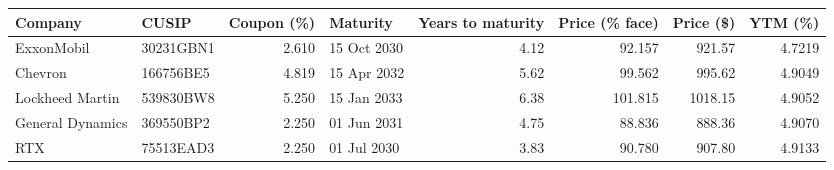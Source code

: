 
\begin{tabular}{llrlrrrr}
\toprule
Company & CUSIP & Coupon (\%) & Maturity & Years to maturity & Price (\% face) & Price (\$) & YTM (\%)\\
\midrule
ExxonMobil & 30231GBN1 & 2.610 & 15 Oct 2030 & 4.12 & 92.157 & 921.57 & 4.7219\\
Chevron & 166756BE5 & 4.819 & 15 Apr 2032 & 5.62 & 99.562 & 995.62 & 4.9049\\
Lockheed Martin & 539830BW8 & 5.250 & 15 Jan 2033 & 6.38 & 101.815 & 1018.15 & 4.9052\\
General Dynamics & 369550BP2 & 2.250 & 01 Jun 2031 & 4.75 & 88.836 & 888.36 & 4.9070\\
RTX & 75513EAD3 & 2.250 & 01 Jul 2030 & 3.83 & 90.780 & 907.80 & 4.9133\\
\bottomrule
\end{tabular}
